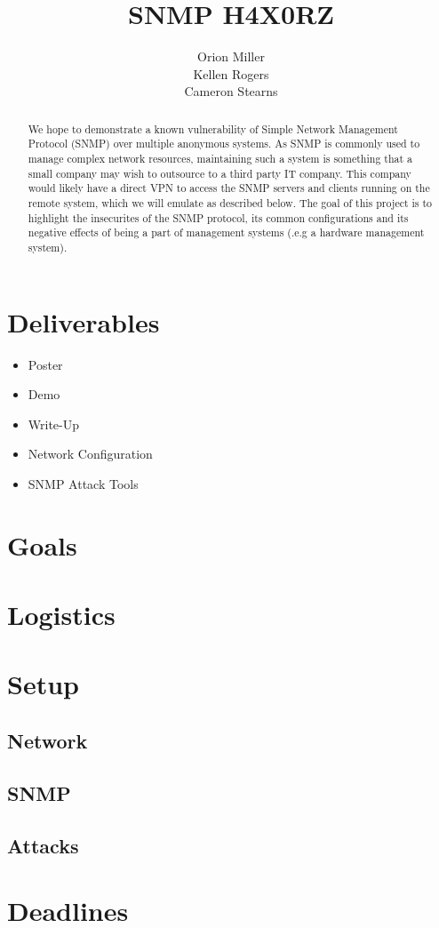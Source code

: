 \documentclass[11pt]{article}
\title{SNMP H4X0RZ}
\author{Orion Miller \\ Kellen Rogers \\ Cameron Stearns}
\begin{document}
\singlespace

\maketitle



\begin{abstract}
We hope to demonstrate a known vulnerability of Simple Network Management 
Protocol (SNMP) over multiple anonymous systems.  As SNMP is commonly used 
to manage complex network resources, maintaining such a system is something 
that a small company may wish to outsource to a third party IT company.  
This company would likely have a direct VPN to access the SNMP servers and 
clients running on the remote system, which we will emulate as described below. 
The goal of this project is to highlight the insecurites of the SNMP protocol,
its common configurations and its negative effects of being a part of 
management systems (.e.g a hardware management system).
\end{abstract}


\setcounter{secnumdepth}{2}

\section{Deliverables}

\begin{itemize}
\item Poster

\item Demo

\item Write-Up

\item Network Configuration

\item SNMP Attack Tools


\end{itemize}

\section{Goals}

\section{Logistics}

\section{Setup}

\subsection{Network}

\subsection{SNMP}

\subsection{Attacks}

\section{Deadlines}
\end{document}
